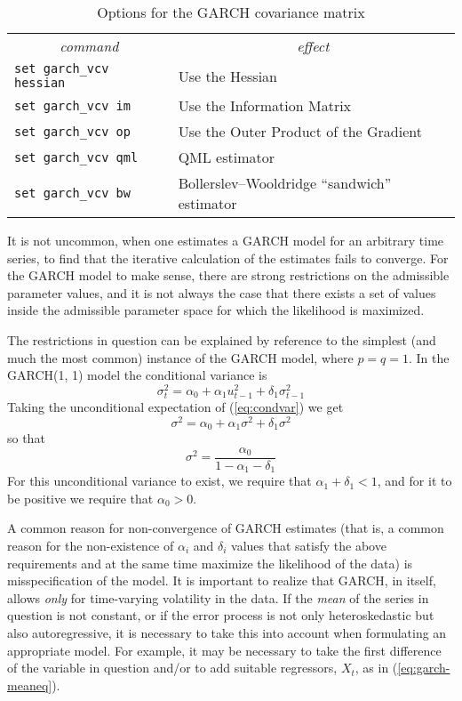 \begin{table}[htbp]
\caption{Options for the GARCH covariance matrix}
\label{tab:garch-vcv}
\begin{center}
\begin{tabular}{ll}
\multicolumn{1}{c}{\textit{command}} &
\multicolumn{1}{c}{\textit{effect}} \\ [4pt]
\texttt{set garch\_vcv hessian} & Use the Hessian \\
\texttt{set garch\_vcv im} & Use the Information Matrix \\
\texttt{set garch\_vcv op} & Use the Outer Product of the Gradient \\
\texttt{set garch\_vcv qml} & QML estimator \\
\texttt{set garch\_vcv bw} & Bollerslev--Wooldridge ``sandwich'' estimator
\end{tabular}
\end{center}
\end{table}

It is not uncommon, when one estimates a GARCH model for an arbitrary
time series, to find that the iterative calculation of the estimates
fails to converge.  For the GARCH model to make sense, there are
strong restrictions on the admissible parameter values, and it is not
always the case that there exists a set of values inside the
admissible parameter space for which the likelihood is maximized.  

The restrictions in question can be explained by reference to the
simplest (and much the most common) instance of the GARCH model, where
$p = q = 1$.  In the GARCH(1, 1) model the conditional variance is
\begin{equation}
\label{eq:condvar}
\sigma^2_t = \alpha_0 + \alpha_1 u^2_{t-1} + \delta_1 \sigma^2_{t-1}
\end{equation}
Taking the unconditional expectation of (\ref{eq:condvar}) we get
\[
\sigma^2 = \alpha_0 + \alpha_1 \sigma^2 + \delta_1 \sigma^2
\]
so that
\[
\sigma^2 = \frac{\alpha_0}{1 - \alpha_1 - \delta_1}
\]
For this unconditional variance to exist, we require that $\alpha_1 +
\delta_1 < 1$, and for it to be positive we require that $\alpha_0 > 0$.

A common reason for non-convergence of GARCH estimates (that is, a
common reason for the non-existence of $\alpha_i$ and $\delta_i$ values
that satisfy the above requirements and at the same time maximize the
likelihood of the data) is misspecification of the model.  It is
important to realize that GARCH, in itself, allows \textit{only} for
time-varying volatility in the data.  If the \textit{mean} of the
series in question is not constant, or if the error process is not
only heteroskedastic but also autoregressive, it is necessary to take
this into account when formulating an appropriate model.  For example,
it may be necessary to take the first difference of the variable in
question and/or to add suitable regressors, $X_t$, as in
(\ref{eq:garch-meaneq}).

